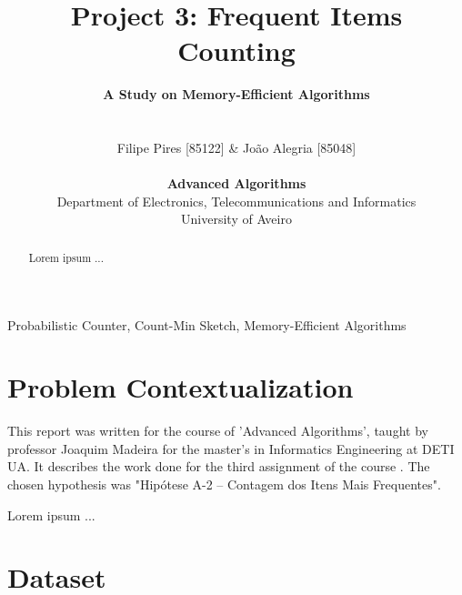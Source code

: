 \documentclass[shortpaper]{revdetua}
\begin{document}
 

\title{
    \LARGE{{\bf Project 3: Frequent Items Counting \/}}
    \vspace{-20pt}
}

\author{
    \Large{{\bf A Study on Memory-Efficient Algorithms\/}}\\\\\\
    Filipe Pires [85122] \& João Alegria [85048]\\
    \\
    {\bf Advanced Algorithms\/}\\
    \normalsize{Department of Electronics, Telecommunications and Informatics}\\
    \normalsize{University of Aveiro}\\
} 

\maketitle


\begin{abstract}
    Lorem ipsum ...
\end{abstract}

\begin{keywords}
    Probabilistic Counter, Count-Min Sketch, Memory-Efficient Algorithms
\end{keywords}


\section{Problem Contextualization}

This report was written for the course of 'Advanced Algorithms', taught by professor Joaquim Madeira for the master's in Informatics Engineering at DETI UA.
It describes the work done for the third assignment of the course \cite{trab3}. 
The chosen hypothesis was "Hipótese A-2 – Contagem dos Itens Mais Frequentes".

Lorem ipsum ...


\section{Dataset}
\end{document}
